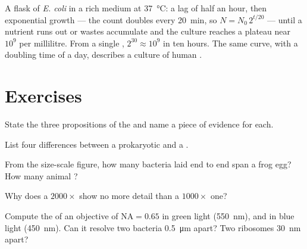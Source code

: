 \begin{example}\label{ex:b1:cell-unit-of-life:growthcurve}
A flask of \emph{E. coli} in a rich medium at \qty{37}{\celsius}: a lag
of half an hour, then exponential growth --- the count doubles every
\qty{20}{min}, so $N = N_0\,2^{t/20}$ --- until a nutrient runs out or
wastes accumulate and the culture reaches a plateau near $10^9$ 
per millilitre. From a single , $2^{30} \approx 10^9$  in ten
hours. The same curve, with a doubling time of a day, describes a
culture of human .
\end{example}

\section{Exercises}

\begin{exercise}[$\star$]\label{exo:b1:cell-unit-of-life:1}
State the three propositions of the  and name a piece of
evidence for each.
\end{exercise}

\begin{exercise}[$\star$]\label{exo:b1:cell-unit-of-life:2}
List four differences between a prokaryotic and a .
\end{exercise}

\begin{exercise}[$\star$]\label{exo:b1:cell-unit-of-life:3}
From the size-scale figure, how many bacteria laid end to end span a
frog egg? How many animal ?
\end{exercise}

\begin{exercise}[$\star$]\label{exo:b1:cell-unit-of-life:4}
Why does a $2000\times$  show no more detail than a
$1000\times$ one?
\end{exercise}

\begin{exercise}[$\star\star$]\label{exo:b1:cell-unit-of-life:5}
Compute the  of an objective of $\mathrm{NA} = 0.65$ in
green light (\qty{550}{nm}), and in blue light (\qty{450}{nm}). Can it
resolve two bacteria \qty{0.5}{\micro m} apart? Two ribosomes
\qty{30}{nm} apart?
\end{exercise}

